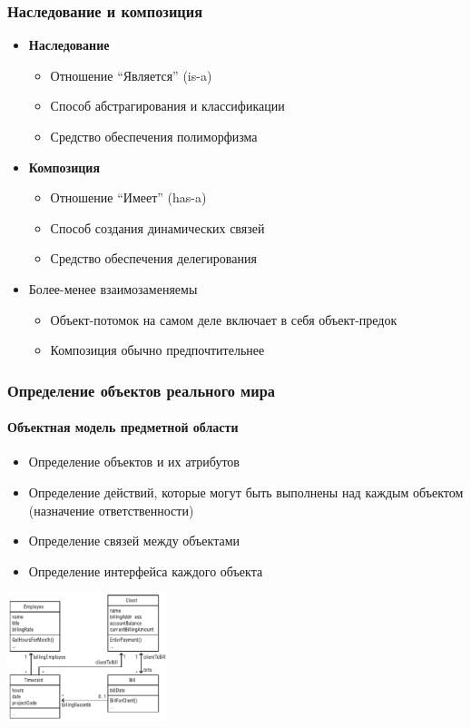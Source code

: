 \documentclass[xetex,mathserif,serif]{beamer}
\begin{document}
	\begin{frame}
		\frametitle{Наследование и композиция}
		\begin{itemize}
			\item \textbf{Наследование}
			\begin{itemize}
				\item Отношение ``Является'' (is-a)
				\item Способ абстрагирования и классификации
				\item Средство обеспечения полиморфизма
			\end{itemize}
			\item \textbf{Композиция}
			\begin{itemize}
				\item Отношение ``Имеет'' (has-a)
				\item Способ создания динамических связей
				\item Средство обеспечения делегирования
			\end{itemize}
			\item Более-менее взаимозаменяемы
			\begin{itemize}
				\item Объект-потомок на самом деле включает в себя объект-предок
				\item Композиция обычно предпочтительнее
			\end{itemize}
		\end{itemize}
	\end{frame}

	\begin{frame}
		\frametitle{Определение объектов реального мира}
		\framesubtitle{Объектная модель предметной области}
		\begin{itemize}
			\item Определение объектов и их атрибутов
			\item Определение действий, которые могут быть выполнены над каждым объектом (назначение ответственности)
			\item Определение связей между объектами
			\item Определение интерфейса каждого объекта
		\end{itemize}
		\begin{center}
			\includegraphics[width=0.35\textwidth]{billDomainModel.png}
		\end{center}
	\end{frame}
\end{document}
